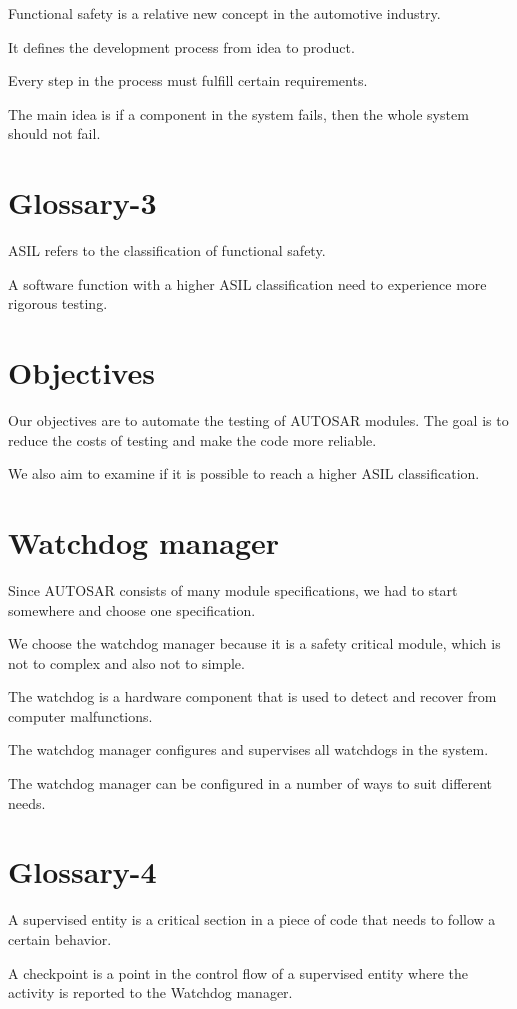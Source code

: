 \documentclass[a4paper]{article}
\begin{document}
Functional safety is a relative new concept in the automotive
industry.

It defines the development process from idea to product.

Every step in the process must fulfill certain requirements.

The main idea is if a component in the system fails, then the whole
system should not fail.

\section{Glossary-3}
ASIL refers to the classification of functional safety.

A software function with a higher ASIL classification need to
experience more rigorous testing.

\section{Objectives}
Our objectives are to automate the testing of AUTOSAR modules. The
goal is to reduce the costs of testing and make the code more
reliable.

We also aim to examine if it is possible to reach a higher ASIL classification.

\section{Watchdog manager}
Since AUTOSAR consists of many module specifications, we had to start
somewhere and choose one specification.

We choose the watchdog manager because it is a safety critical module,
which is not to complex and also not to simple.

The watchdog is a hardware component that is used to detect and
recover from computer malfunctions.

The watchdog manager configures and supervises all watchdogs in the
system.

The watchdog manager can be configured in a number of ways to suit
different needs.

\section{Glossary-4}
A supervised entity is a critical section in a piece of code that
needs to follow a certain behavior.

A checkpoint is a point in the control flow of a supervised entity
where the activity is reported to the Watchdog manager.
\end{document}
